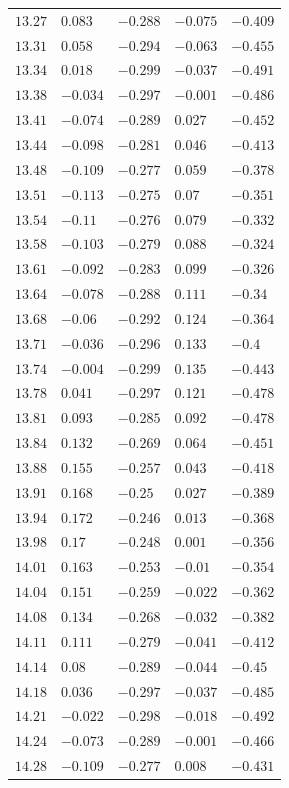 \begin{table}[h]
\begin{tabular}{rllll}
$13.27$&$0.083$&$-0.288$&$-0.075$&$-0.409$\\
$13.31$&$0.058$&$-0.294$&$-0.063$&$-0.455$\\
$13.34$&$0.018$&$-0.299$&$-0.037$&$-0.491$\\
$13.38$&$-0.034$&$-0.297$&$-0.001$&$-0.486$\\
$13.41$&$-0.074$&$-0.289$&$0.027$&$-0.452$\\
$13.44$&$-0.098$&$-0.281$&$0.046$&$-0.413$\\
$13.48$&$-0.109$&$-0.277$&$0.059$&$-0.378$\\
$13.51$&$-0.113$&$-0.275$&$0.07$&$-0.351$\\
$13.54$&$-0.11$&$-0.276$&$0.079$&$-0.332$\\
$13.58$&$-0.103$&$-0.279$&$0.088$&$-0.324$\\
$13.61$&$-0.092$&$-0.283$&$0.099$&$-0.326$\\
$13.64$&$-0.078$&$-0.288$&$0.111$&$-0.34$\\
$13.68$&$-0.06$&$-0.292$&$0.124$&$-0.364$\\
$13.71$&$-0.036$&$-0.296$&$0.133$&$-0.4$\\
$13.74$&$-0.004$&$-0.299$&$0.135$&$-0.443$\\
$13.78$&$0.041$&$-0.297$&$0.121$&$-0.478$\\
$13.81$&$0.093$&$-0.285$&$0.092$&$-0.478$\\
$13.84$&$0.132$&$-0.269$&$0.064$&$-0.451$\\
$13.88$&$0.155$&$-0.257$&$0.043$&$-0.418$\\
$13.91$&$0.168$&$-0.25$&$0.027$&$-0.389$\\
$13.94$&$0.172$&$-0.246$&$0.013$&$-0.368$\\
$13.98$&$0.17$&$-0.248$&$0.001$&$-0.356$\\
$14.01$&$0.163$&$-0.253$&$-0.01$&$-0.354$\\
$14.04$&$0.151$&$-0.259$&$-0.022$&$-0.362$\\
$14.08$&$0.134$&$-0.268$&$-0.032$&$-0.382$\\
$14.11$&$0.111$&$-0.279$&$-0.041$&$-0.412$\\
$14.14$&$0.08$&$-0.289$&$-0.044$&$-0.45$\\
$14.18$&$0.036$&$-0.297$&$-0.037$&$-0.485$\\
$14.21$&$-0.022$&$-0.298$&$-0.018$&$-0.492$\\
$14.24$&$-0.073$&$-0.289$&$-0.001$&$-0.466$\\
$14.28$&$-0.109$&$-0.277$&$0.008$&$-0.431$\\

\end{tabular}
\end{table}
